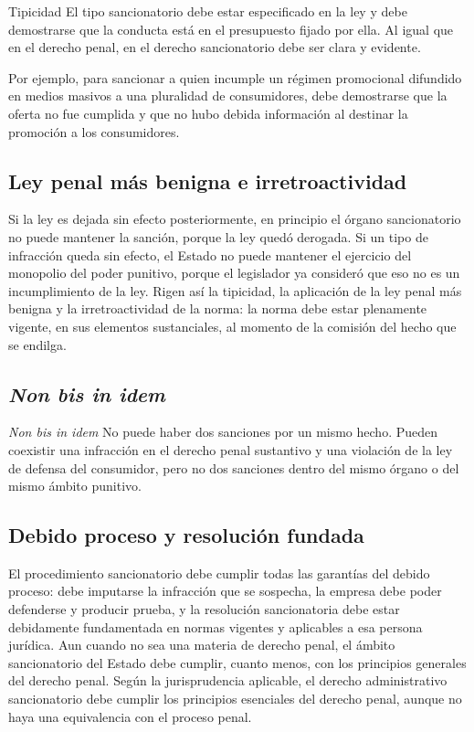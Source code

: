\documentclass[12pt,oneside]{book}
\begin{document}
\begin{definition}{Tipicidad}
El tipo sancionatorio debe estar especificado en la ley y debe demostrarse que la conducta está en el presupuesto fijado por ella. Al igual que en el derecho penal, en el derecho sancionatorio debe ser clara y evidente.
\end{definition}

Por ejemplo, para sancionar a quien incumple un régimen promocional difundido en medios masivos a una pluralidad de consumidores, debe demostrarse que la oferta no fue cumplida y que no hubo debida información al destinar la promoción a los consumidores.

\subsection{Ley penal más benigna e irretroactividad}

Si la ley es dejada sin efecto posteriormente, en principio el órgano sancionatorio no puede mantener la sanción, porque la ley quedó derogada. Si un tipo de infracción queda sin efecto, el Estado no puede mantener el ejercicio del monopolio del poder punitivo, porque el legislador ya consideró que eso no es un incumplimiento de la ley. Rigen así la tipicidad, la aplicación de la ley penal más benigna y la irretroactividad de la norma: la norma debe estar plenamente vigente, en sus elementos sustanciales, al momento de la comisión del hecho que se endilga.

\subsection{\textit{Non bis in idem}}

\begin{definition}{\textit{Non bis in idem}}
No puede haber dos sanciones por un mismo hecho. Pueden coexistir una infracción en el derecho penal sustantivo y una violación de la ley de defensa del consumidor, pero no dos sanciones dentro del mismo órgano o del mismo ámbito punitivo.
\end{definition}

\subsection{Debido proceso y resolución fundada}

El procedimiento sancionatorio debe cumplir todas las garantías del debido proceso: debe imputarse la infracción que se sospecha, la empresa debe poder defenderse y producir prueba, y la resolución sancionatoria debe estar debidamente fundamentada en normas vigentes y aplicables a esa persona jurídica. Aun cuando no sea una materia de derecho penal, el ámbito sancionatorio del Estado debe cumplir, cuanto menos, con los principios generales del derecho penal. Según la jurisprudencia aplicable, el derecho administrativo sancionatorio debe cumplir los principios esenciales del derecho penal, aunque no haya una equivalencia con el proceso penal.
\end{document}
